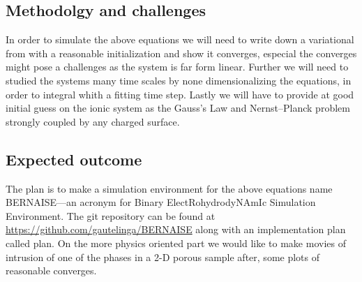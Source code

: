 \documentclass[a4paper,10pt]{article}
\begin{document}
\subsection*{Methodolgy and challenges}
In order to simulate the above equations we will need to write down a variational from with a reasonable initialization and show it converges, especial the converges might pose a challenges as the system is far form linear. 
Further we will need to studied the systems many time scales by none dimensionalizing the equations, in order to integral whith a fitting time step. 
Lastly we will have to provide at good initial guess on the ionic system as the Gauss's Law and Nernst--Planck problem strongly coupled by any charged surface.

\subsection*{Expected outcome} 
The plan is to make a simulation environment for the above equations name BERNAISE---an acronym for Binary ElectRohydrodyNAmIc Simulation Environment.
The git repository can be found at \url{https://github.com/gautelinga/BERNAISE} along with an implementation plan called plan.
On the more physics oriented part we would like to make movies of intrusion of one of the phases in a 2-D porous sample after, some plots of reasonable converges.   
\end{document}
